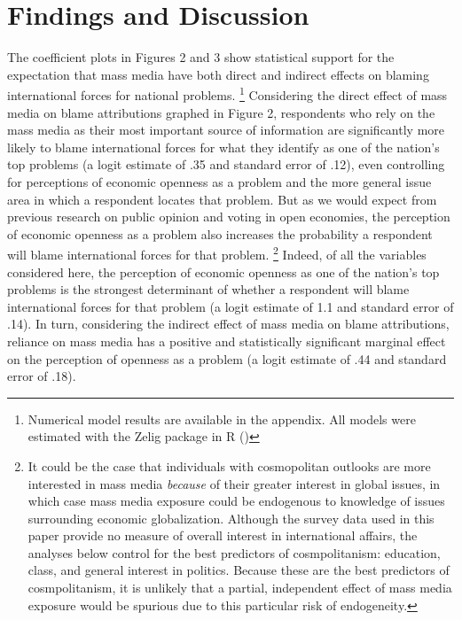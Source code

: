 \documentclass[12pt]{report}
\begin{document}
\section{Findings and Discussion}

The coefficient plots in Figures 2 and 3 show statistical support for the expectation that mass
media have both direct and indirect effects on blaming international forces for national problems.%
\footnote{Numerical model results are available in the appendix. All models were estimated with the
Zelig package in R (\citealt{ZeligEveryonesSt:2009ts})} Considering the direct effect of mass
media on blame attributions graphed in Figure 2, respondents who rely on the mass media as their
most important source of information are significantly more likely to blame international forces for
what they identify as one of the nation's top problems (a logit estimate of .35 and standard error
of .12), even controlling for perceptions of economic openness as a problem and the more general
issue area in which a respondent locates that problem. But as we would expect from previous research
on public opinion and voting in open economies, the perception of economic openness as a problem
also increases the probability a respondent will blame international forces for that problem.%
\footnote{It could be the case that individuals with cosmopolitan outlooks are more interested in
mass media \emph{because} of their greater interest in global issues, in which case mass media
exposure could be endogenous to knowledge of issues surrounding economic globalization. Although the
survey data used in this paper provide no measure of overall interest in international affairs, the
analyses below control for the best predictors of cosmpolitanism: education, class, and general
interest in politics. Because these are the best predictors of cosmpolitanism, it is unlikely that a
partial, independent effect of mass media exposure would be spurious due to this particular risk of
endogeneity.} Indeed, of all the variables considered here, the perception of economic openness as
one of the nation's top problems is the strongest determinant of whether a respondent will blame
international forces for that problem (a logit estimate of 1.1 and standard error of .14). In turn,
considering the indirect effect of mass media on blame attributions, reliance on mass media has a
positive and statistically significant marginal effect on the perception of openness as a problem (a
logit estimate of .44 and standard error of .18).
\end{document}

